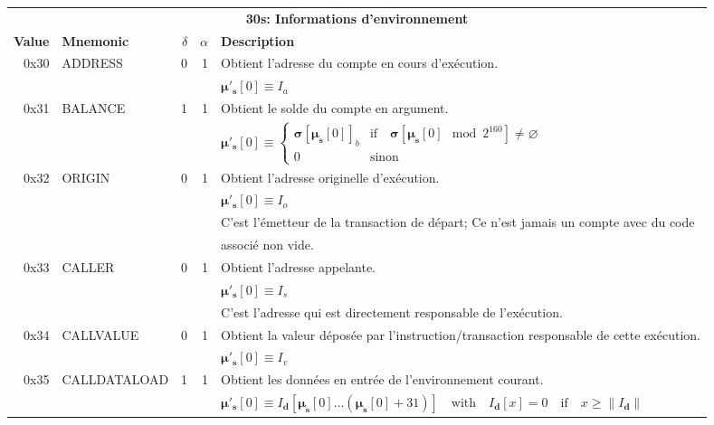 \documentclass[9pt,oneside]{amsart}
\begin{document}
\begin{tabular*}{\columnwidth}[h]{rlrrl}
\toprule
\multicolumn{5}{c}{\textbf{30s: Informations d'environnement}} \vspace{5pt} \\
\textbf{Value} & \textbf{Mnemonic} & $\delta$ & $\alpha$ & \textbf{Description} \vspace{5pt} \\
0x30 & {\small ADDRESS} & 0 & 1 & Obtient l'adresse du compte en cours d'exécution. \\
&&&& $\boldsymbol{\mu}'_\mathbf{s}[0] \equiv I_a$ \\
\midrule
0x31 & {\small BALANCE} & 1 & 1 & Obtient le solde du compte en argument. \\
&&&& $\boldsymbol{\mu}'_\mathbf{s}[0] \equiv \begin{cases}\boldsymbol{\sigma}[\boldsymbol{\mu}_\mathbf{s}[0]]_b& \text{if} \quad \boldsymbol{\sigma}[\boldsymbol{\mu}_\mathbf{s}[0] \mod 2^{160}] \neq \varnothing\\0&\text{sinon}\end{cases}$ \\
\midrule
0x32 & {\small ORIGIN} & 0 & 1 & Obtient l'adresse originelle d'exécution. \\
&&&& $\boldsymbol{\mu}'_\mathbf{s}[0] \equiv I_o$ \\
&&&& C'est l'émetteur de la transaction de départ; Ce n'est jamais un compte avec du code \\
&&&& associé non vide. \\
\midrule
0x33 & {\small CALLER} & 0 & 1 & Obtient l'adresse appelante. \\
&&&& $\boldsymbol{\mu}'_\mathbf{s}[0] \equiv I_s$ \\
&&&& C'est l'adresse qui est directement responsable de l'exécution. \\
\midrule
0x34 & {\small CALLVALUE} & 0 & 1 & Obtient la valeur déposée par l'instruction/transaction responsable de cette exécution. \\
&&&& $\boldsymbol{\mu}'_\mathbf{s}[0] \equiv I_v$ \\
\midrule
0x35 & {\small CALLDATALOAD} & 1 & 1 & Obtient les données en entrée de l'environnement courant. \\
&&&& $\boldsymbol{\mu}'_\mathbf{s}[0] \equiv I_\mathbf{d}[ \boldsymbol{\mu}_\mathbf{s}[0] \dots (\boldsymbol{\mu}_\mathbf{s}[0] + 31) ] \quad \text{with} \quad I_\mathbf{d}[x] = 0 \quad \text{if} \quad x \geqslant \lVert I_\mathbf{d} \rVert$ \\

\end{tabular*}
\end{document}
